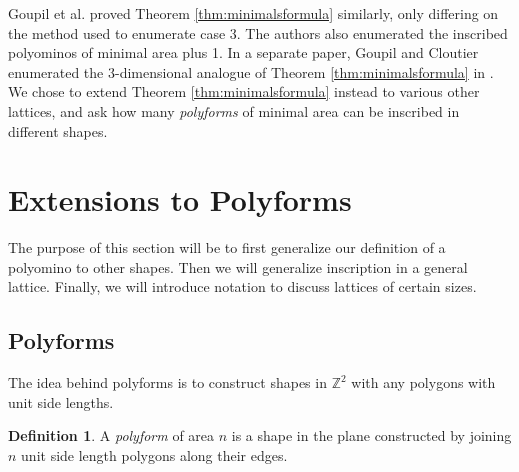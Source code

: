 \documentclass[12pt]{article}
\theoremstyle{plain}
\theoremstyle{definition}
\theoremstyle{remark}
\theoremstyle{definition}
\newtheorem{definition}{Definition}[section]
\newcommand{\createtri}[6]{\filldraw[gray!40] ( #1 , #2 ) -- ( #3 , #4 ) -- ( #5 , #6 ) -- cycle; \draw[thick] ( #1 , #2 ) -- ( #3 , #4 ) -- ( #5 , #6 ) -- cycle;}
\begin{document}
Goupil et al. \cite{10.1016/j.dam.2010.08.011} proved Theorem \ref{thm:minimalsformula} similarly, only differing on the method used to enumerate case 3. The authors also enumerated the inscribed polyominos of minimal area plus 1. In a separate paper, Goupil and Cloutier enumerated the $3$-dimensional analogue of Theorem \ref{thm:minimalsformula} in \cite{Goupil2011EnumerationOM}. We chose to extend Theorem \ref{thm:minimalsformula} instead to various other lattices, and ask how many \textit{polyforms} of minimal area can be inscribed in different shapes.

\section{Extensions to Polyforms}\label{sec:extensions}

The purpose of this section will be to first generalize our definition of a polyomino to other shapes. Then we will generalize inscription in a general lattice. Finally, we will introduce notation to discuss lattices of certain sizes.

\subsection{Polyforms}

The idea behind polyforms is to construct shapes in $\mathbb{Z}^2$ with any polygons with unit side lengths.

\begin{definition}
A \textit{polyform} of area $n$ is a shape in the plane constructed by joining $n$ unit side length polygons along their edges. 
\end{definition}

\begin{center}
    \label{fig:polyform polyiamond}
\end{center}
\end{document}
